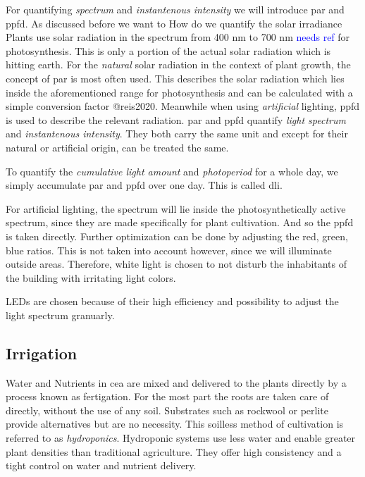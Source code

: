For quantifying \textit{spectrum} and \textit{instantenous intensity} we will introduce \ac{par} and \ac{ppfd}.
As discussed before we want to 
How do we quantify the solar irradiance 
Plants use solar radiation in the spectrum from 400 nm to 700 nm \textcolor{Blue}{needs ref} for photosynthesis.
This is only a portion of the actual solar radiation which is hitting earth.
For the \textit{natural} solar radiation in the context of plant growth, the concept of \ac{par} is most often used.
This describes the solar radiation which lies inside the aforementioned range for photosynthesis and can be calculated with a simple conversion factor @reis2020.
Meanwhile when using \textit{artificial} lighting, \ac{ppfd} is used to describe the relevant radiation.
\ac{par} and \ac{ppfd} quantify \textit{light spectrum} and \textit{instantenous intensity}.
They both carry the same unit and except for their natural or artificial origin, can be treated the same.

To quantify the \textit{cumulative light amount} and \textit{photoperiod} for a whole day, we simply accumulate \ac{par} and \ac{ppfd} over one day.
This is called \ac{dli}.

For artificial lighting, the spectrum will lie inside the photosynthetically active spectrum, since they are made specifically for plant cultivation.
And so the ppfd is taken directly.
Further optimization can be done by adjusting the red, green, blue ratios.
This is not taken into account however, since we will illuminate outside areas.
Therefore, white light is chosen to not disturb the inhabitants of the building with irritating light colors.

LEDs are chosen because of their high efficiency and possibility to adjust the light spectrum granuarly.



\subsection{Irrigation}
Water and Nutrients in \ac{cea} are mixed and delivered to the plants directly by a process known as fertigation.
For the most part the roots are taken care of directly, without the use of any soil.
Substrates such as rockwool or perlite provide alternatives but are no necessity.
This soilless method of cultivation is referred to as \textit{hydroponics}.
Hydroponic systems use less water and enable greater plant densities than traditional agriculture.
They offer high consistency and a tight control on water and nutrient delivery.

